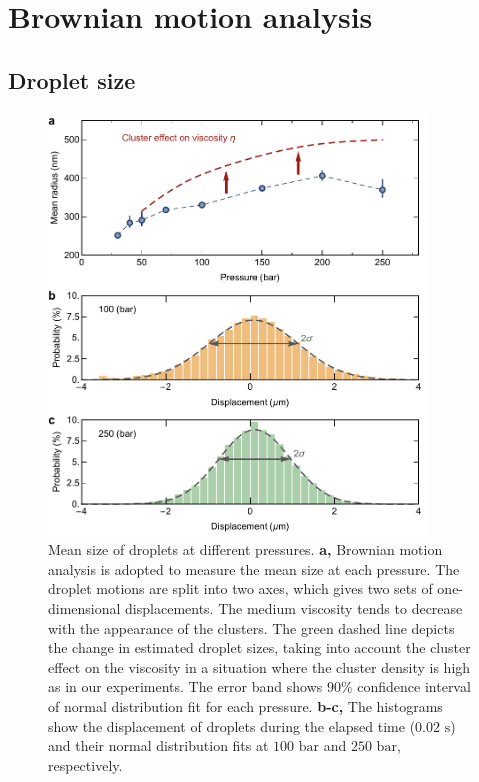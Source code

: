 \section{Brownian motion analysis}
\label{sec:ch2-4}

\subsection{Droplet size}
\label{sec:ch2-4-1}

\begin{figure}[ht!]
\centering
\includegraphics[width=100mm]{figures/ch2/Brownian/size.pdf}
\caption{Mean size of droplets at different pressures. \textbf{a,} Brownian motion analysis is adopted to measure the mean size at each pressure. The droplet motions are split into two axes, which gives two sets of one-dimensional displacements. The medium viscosity tends to decrease with the appearance of the clusters. The green dashed line depicts the change in estimated droplet sizes, taking into account the cluster effect on the viscosity in a situation where the cluster density is high as in our experiments. The error band shows $90\%$ confidence interval of normal distribution fit for each pressure. \textbf{b-c,} The histograms show the displacement of droplets during the elapsed time ($0.02 \text{ s}$) and their normal distribution fits at $100 \text{ bar}$ and $250 \text{ bar}$, respectively.}
\label{fig:size}
\end{figure}

